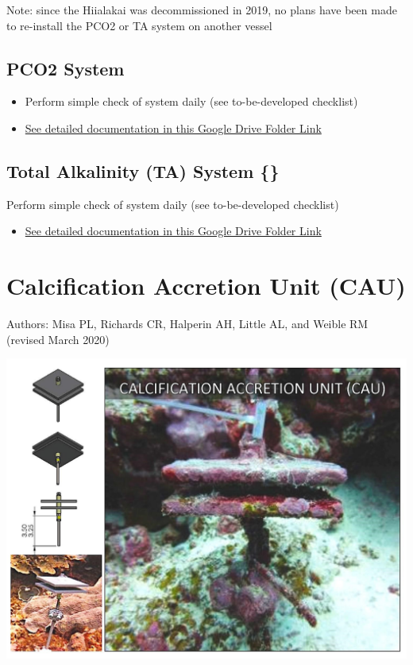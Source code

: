 \documentclass[]{book}
\providecommand{\tightlist}{%
  \setlength{\itemsep}{0pt}\setlength{\parskip}{0pt}}
\begin{document}
Note: since the Hiialakai was decommissioned in 2019, no plans have been made to re-install the PCO2 or TA system on another vessel

\hypertarget{pco2}{%
\section{PCO2 System}\label{pco2}}

\begin{itemize}
\tightlist
\item
  Perform simple check of system daily (see to-be-developed checklist)
\item
  \href{https://drive.google.com/drive/folders/1p-Evjb3zrw4Kk460knsl4rI4m2Un_jyy}{See detailed documentation in this Google Drive Folder Link}
\end{itemize}

\hypertarget{total-alkalinity-ta-system-ta}{%
\section{\texorpdfstring{Total Alkalinity (TA) System \{\citet{ta}\}}{Total Alkalinity (TA) System \{@ta\}}}\label{total-alkalinity-ta-system-ta}}

Perform simple check of system daily (see to-be-developed checklist)

\begin{itemize}
\tightlist
\item
  \href{https://drive.google.com/drive/folders/1p-Evjb3zrw4Kk460knsl4rI4m2Un_jyy}{See detailed documentation in this Google Drive Folder Link}
\end{itemize}

\hypertarget{calcification-accretion-unit-cau}{%
\chapter{Calcification Accretion Unit (CAU)}\label{calcification-accretion-unit-cau}}

Authors: Misa PL, Richards CR, Halperin AH, Little AL, and Weible RM (revised March 2020)

\includegraphics{images/CAU.jpg}
\end{document}
